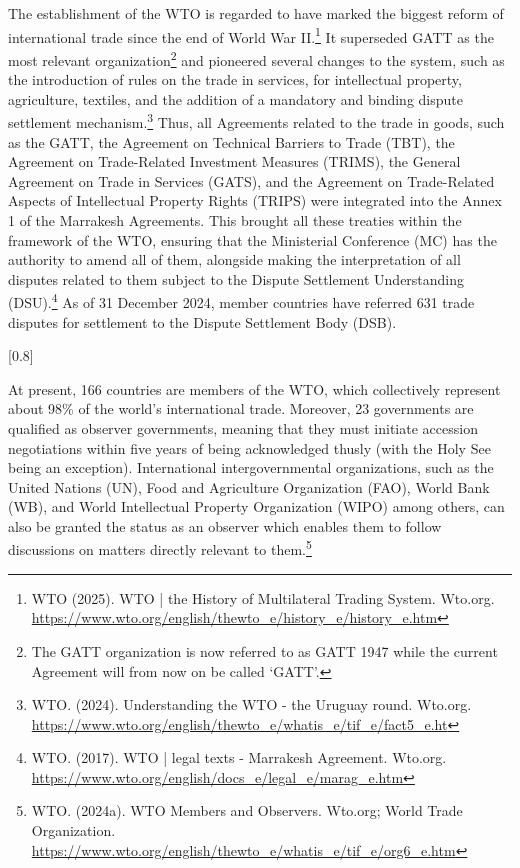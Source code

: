 The establishment of the WTO is regarded to have marked the biggest reform of international trade since the end of World War II.\footnote{WTO (2025). WTO | the History of Multilateral Trading System. Wto.org. \url{https://www.wto.org/english/thewto_e/history_e/history_e.htm}} It superseded GATT as the most relevant organization\footnote{The GATT organization is now referred to as GATT 1947 while the current Agreement will from now on be called ‘GATT’.} and pioneered several changes to the system, such as the introduction of rules on the trade in services, for intellectual property, agriculture, textiles, and the addition of a mandatory and binding dispute settlement mechanism.\footnote{WTO. (2024). Understanding the WTO - the Uruguay round. Wto.org. \url{https://www.wto.org/english/thewto_e/whatis_e/tif_e/fact5_e.ht}} Thus, all Agreements related to the trade in goods, such as the GATT, the Agreement on Technical Barriers to Trade (TBT), the Agreement on Trade-Related Investment Measures (TRIMS), the General Agreement on Trade in Services (GATS), and the Agreement on Trade-Related Aspects of Intellectual Property Rights (TRIPS) were integrated into the Annex 1 of the Marrakesh Agreements. This brought all these treaties within the framework of the WTO, ensuring that the Ministerial Conference (MC) has the authority to amend all of them, alongside making the interpretation of all disputes related to them subject to the Dispute Settlement Understanding (DSU).\footnote{WTO. (2017). WTO | legal texts - Marrakesh Agreement. Wto.org. \url{https://www.wto.org/english/docs_e/legal_e/marag_e.htm}} As of 31 December 2024, member countries have referred 631 trade disputes for settlement to the Dispute Settlement Body (DSB).

[0.8]

At present, 166 countries are members of the WTO, which collectively represent about 98\% of the world’s international trade. Moreover, 23 governments are qualified as observer governments, meaning that they must initiate accession negotiations within five years of being acknowledged thusly (with the Holy See being an exception). International intergovernmental organizations, such as the United Nations (UN), Food and Agriculture Organization (FAO), World Bank (WB), and World Intellectual Property Organization (WIPO) among others, can also be granted the status as an observer which enables them to follow discussions on matters directly relevant to them.\footnote{WTO. (2024a). WTO Members and Observers. Wto.org; World Trade Organization. \url{https://www.wto.org/english/thewto_e/whatis_e/tif_e/org6_e.htm}}

